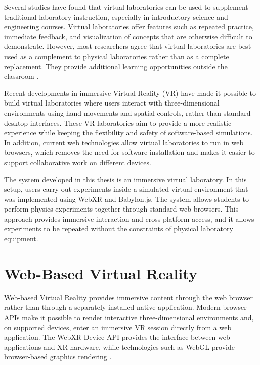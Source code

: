 Several studies have found that virtual laboratories can be used to supplement traditional laboratory instruction, especially in introductory science and engineering courses. Virtual laboratories offer features such as repeated practice, immediate feedback, and visualization of concepts that are otherwise difficult to demonstrate. However, most researchers agree that virtual laboratories are best used as a complement to physical laboratories rather than as a complete replacement. They provide additional learning opportunities outside the classroom \cite{potkonjak2016virtual, heradio2016virtual}.

Recent developments in immersive Virtual Reality (VR) have made it possible to build virtual laboratories where users interact with three-dimensional environments using hand movements and spatial controls, rather than standard desktop interfaces. These VR laboratories aim to provide a more realistic experience while keeping the flexibility and safety of software-based simulations. In addition, current web technologies allow virtual laboratories to run in web browsers, which removes the need for software installation and makes it easier to support collaborative work on different devices.

The system developed in this thesis is an immersive virtual laboratory. In this setup, users carry out experiments inside a simulated virtual environment that was implemented using WebXR and Babylon.js. The system allows students to perform physics experiments together through standard web browsers. This approach provides immersive interaction and cross-platform access, and it allows experiments to be repeated without the constraints of physical laboratory equipment.



\section{Web-Based Virtual Reality}

Web-based Virtual Reality provides immersive content through the web browser rather than through a separately installed native application. Modern browser APIs make it possible to render interactive three-dimensional environments and, on supported devices, enter an immersive VR session directly from a web application. The WebXR Device API provides the interface between web applications and XR hardware, while technologies such as WebGL provide browser-based graphics rendering \cite{steed2020webxr}.

